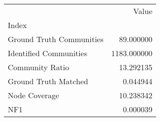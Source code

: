 \begin{tabular}{lr}
\toprule
{} &        Value \\
Index                    &              \\
\midrule
Ground Truth Communities &    89.000000 \\
Identified Communities   &  1183.000000 \\
Community Ratio          &    13.292135 \\
Ground Truth Matched     &     0.044944 \\
Node Coverage            &    10.238342 \\
NF1                      &     0.000039 \\
\bottomrule
\end{tabular}
